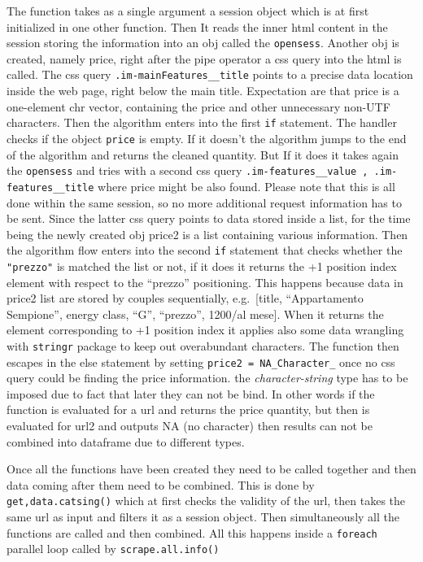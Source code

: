 \documentclass[
  12pt,
  a4paper,
  oneside]{book}
\theoremstyle{definition}
\theoremstyle{definition}
\theoremstyle{definition}
\theoremstyle{remark}
\begin{document}
The function takes as a single argument a session object which is at first initialized in one other function. Then It reads the inner html content in the session storing the information into an obj called the \texttt{opensess}. Another obj is created, namely price, right after the pipe operator a css query into the html is called. The css query \texttt{.im-mainFeatures\_\_title} points to a precise data location inside the web page, right below the main title. Expectation are that price is a one-element chr vector, containing the price and other unnecessary non-UTF characters. Then the algorithm enters into the first \texttt{if} statement. The handler checks if the object \texttt{price} is empty. If it doesn't the algorithm jumps to the end of the algorithm and returns the cleaned quantity. But If it does it takes again the \texttt{opensess} and tries with a second css query \texttt{.im-features\_\_value\ ,\ .im-features\_\_title} where price might be also found. Please note that this is all done within the same session, so no more additional request information has to be sent. Since the latter css query points to data stored inside a list, for the time being the newly created obj price2 is a list containing various information. Then the algorithm flow enters into the second \texttt{if} statement that checks whether the \texttt{"prezzo"} is matched the list or not, if it does it returns the +1 position index element with respect to the ``prezzo'' positioning. This happens because data in price2 list are stored by couples sequentially, e.g.~{[}title, ``Appartamento Sempione'', energy class, ``G'', ``prezzo'', 1200/al mese{]}. When it returns the element corresponding to +1 position index it applies also some data wrangling with \texttt{stringr} package to keep out overabundant characters. The function then escapes in the else statement by setting \texttt{price2\ =\ NA\_Character\_} once no css query could be finding the price information. the \emph{character-string} type has to be imposed due to fact that later they can not be bind. In other words if the function is evaluated for a url and returns the price quantity, but then is evaluated for url2 and outputs NA (no character) then results can not be combined into dataframe due to different types.

Once all the functions have been created they need to be called together and then data coming after them need to be combined. This is done by \texttt{get,data.catsing()} which at first checks the validity of the url, then takes the same url as input and filters it as a session object. Then simultaneously all the functions are called and then combined. All this happens inside a \texttt{foreach} parallel loop called by \texttt{scrape.all.info()}
\end{document}
